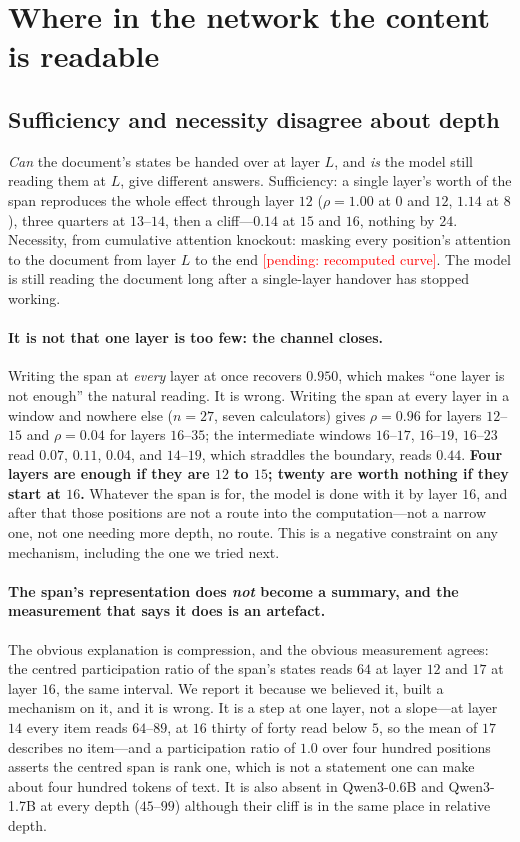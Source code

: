 \documentclass{article}
\newcommand{\PEND}[1]{\textcolor{red}{[pending: #1]}}
\begin{document}
\section{Where in the network the content is readable}
\label{sec:where}

\subsection{Sufficiency and necessity disagree about depth}
\label{sec:depth}

\emph{Can} the document's states be handed over at layer $L$, and \emph{is} the
model still reading them at $L$, give different answers. Sufficiency: a single
layer's worth of the span reproduces the whole effect through layer $12$
($\rho = 1.00$ at $0$ and $12$, $1.14$ at $8$), three quarters at $13$--$14$,
then a cliff---$0.14$ at $15$ and $16$, nothing by $24$. Necessity, from
cumulative attention knockout: masking every position's attention to the
document from layer $L$ to the end \PEND{recomputed curve}. The model is still
reading the document long after a single-layer handover has stopped working.

\paragraph{It is not that one layer is too few: the channel closes.} Writing the
span at \emph{every} layer at once recovers $0.950$, which makes ``one layer is
not enough'' the natural reading. It is wrong. Writing the span at every layer
in a window and nowhere else ($n=27$, seven calculators) gives $\rho = 0.96$ for
layers $12$--$15$ and $\rho = 0.04$ for layers $16$--$35$; the intermediate
windows $16$--$17$, $16$--$19$, $16$--$23$ read $0.07$, $0.11$, $0.04$, and
$14$--$19$, which straddles the boundary, reads $0.44$. \textbf{Four layers are
enough if they are $12$ to $15$; twenty are worth nothing if they start at
$16$.} Whatever the span is for, the model is done with it by layer $16$, and
after that those positions are not a route into the computation---not a narrow
one, not one needing more depth, no route. This is a negative constraint on any
mechanism, including the one we tried next.

\paragraph{The span's representation does \emph{not} become a summary, and the
measurement that says it does is an artefact.} The obvious explanation is
compression, and the obvious measurement agrees: the centred participation ratio
of the span's states reads $64$ at layer $12$ and $17$ at layer $16$, the same
interval. We report it because we believed it, built a mechanism on it, and it
is wrong. It is a step at one layer, not a slope---at layer $14$ every item
reads $64$--$89$, at $16$ thirty of forty read below $5$, so the mean of $17$
describes no item---and a participation ratio of $1.0$ over four hundred
positions asserts the centred span is rank one, which is not a statement one can
make about four hundred tokens of text. It is also absent in Qwen3-0.6B and
Qwen3-1.7B at every depth ($45$--$99$) although their cliff is in the same place
in relative depth.
\end{document}
